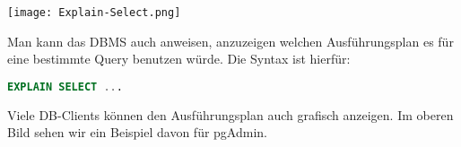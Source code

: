 \texttt{[image: Explain-Select.png]}

Man kann das DBMS auch anweisen, anzuzeigen welchen Ausführungsplan es für eine bestimmte Query benutzen würde. Die Syntax ist hierfür:
\begin{lstlisting}[language=SQL]
    EXPLAIN SELECT ...
\end{lstlisting}

Viele DB-Clients können den Ausführungsplan auch grafisch anzeigen. Im oberen Bild sehen wir ein Beispiel davon für pgAdmin.